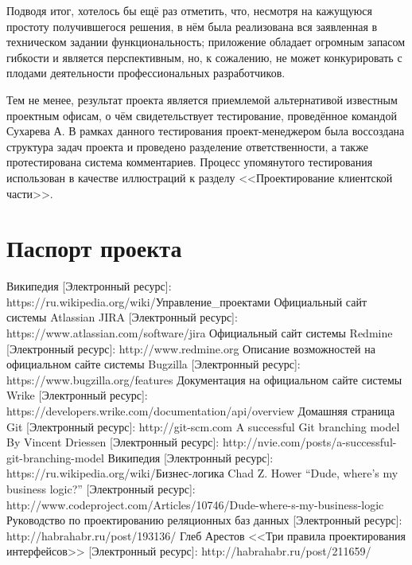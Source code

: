 \documentclass[a4paper, 14pt]{extarticle}
\begin{document}
Подводя итог, хотелось бы ещё раз отметить, что, несмотря на кажущуюся простоту получившегося решения, в нём была реализована вся заявленная в техническом задании функциональность; приложение обладает огромным запасом гибкости и является перспективным, но, к сожалению, не может конкурировать с плодами деятельности профессиональных разработчиков.

Тем не менее, результат проекта является приемлемой альтернативой известным проектным офисам, о чём свидетельствует тестирование, проведённое командой Сухарева А. В рамках данного тестирования проект-менеджером была воссоздана структура задач проекта и проведено разделение ответственности, а также протестирована система комментариев. Процесс упомянутого тестирования использован в качестве иллюстраций к разделу <<Проектирование клиентской части>>.

\newpage


\section{Паспорт проекта}
\newpage


\begin{thebibliography}{}
 Википедия [Электронный ресурс]: \\https://ru.wikipedia.org/wiki/Управление\_проектами
 Официальный сайт системы Atlassian JIRA [Электронный ресурс]: https://www.atlassian.com/software/jira
 Официальный сайт системы Redmine [Электронный ресурс]: http://www.redmine.org
 Описание возможностей на официальном сайте системы Bugzilla [Электронный ресурс]: https://www.bugzilla.org/features
 Документация на официальном сайте системы Wrike [Электронный ресурс]: https://developers.wrike.com/documentation/api/overview
 Домашняя страница Git [Электронный ресурс]: http://git-scm.com
 A successful Git branching model By Vincent Driessen [Электронный ресурс]: http://nvie.com/posts/a-successful-git-branching-model
\bibitem{} Википедия [Электронный ресурс]: \\https://ru.wikipedia.org/wiki/Бизнес-логика
\bibitem{} Chad Z. Hower ``Dude, where's my business logic?'' [Электронный ресурс]: http://www.codeproject.com/Articles/10746/Dude-where-s-my-business-logic
\bibitem{} Руководство по проектированию реляционных баз данных [Электронный ресурс]: http://habrahabr.ru/post/193136/
\bibitem{} Глеб Арестов <<Три правила проектирования интерфейсов>> [Электронный ресурс]: http://habrahabr.ru/post/211659/
\end{thebibliography}
\end{document}

